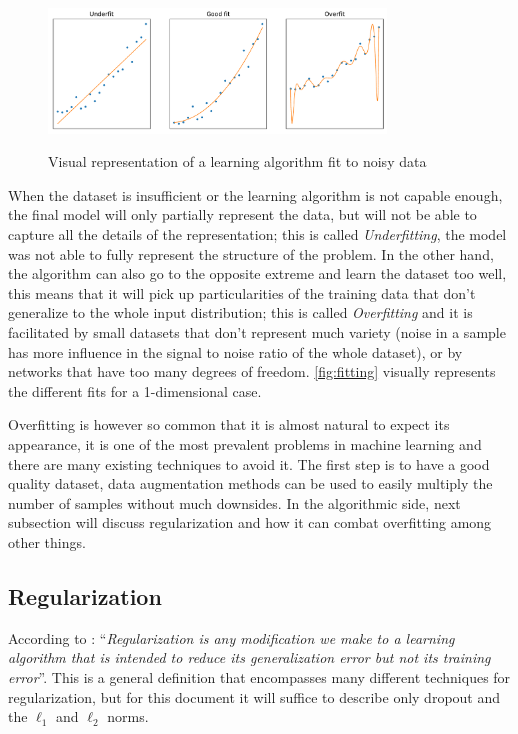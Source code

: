 \begin{figure} [hbt]
    \centering
    \caption{Visual representation of a learning algorithm fit to noisy data}
    \includegraphics[width=0.8\textwidth]{chapters/NeuralNets/figures/fitting.pdf}
    \label{fig:fitting}
\end{figure}
When the dataset is insufficient or the learning algorithm is not capable enough, the final model will only partially represent the data, but will not be able to capture all the details of the representation; this is called \textit{Underfitting}, the model was not able to fully represent the structure of the problem. In the other hand, the algorithm can also go to the opposite extreme and learn the dataset too well, this means that it will pick up particularities of the training data that don't generalize to the whole input distribution; this is called \textit{Overfitting} and it is facilitated by small datasets that don't represent much variety (noise in a sample has more influence in the signal to noise ratio of the whole dataset), or by networks that have too many degrees of freedom. \autoref{fig:fitting} visually represents the different fits for a 1-dimensional case.

Overfitting is however so common that it is almost natural to expect its appearance, it is one of the most prevalent problems in machine learning and there are many existing techniques to avoid it. The first step is to have a good quality dataset, data augmentation methods can be used to easily multiply the number of samples without much downsides. In the algorithmic side, next subsection will discuss regularization and how it can combat overfitting among other things.

\subsection{Regularization} \label{sub:regularization}
According to \cite[p. 117]{deepLearningBook2016}: ``\textit{Regularization is any modiﬁcation we make to a learning algorithm that is intended to reduce its generalization error but not its training error}''. This is a general definition that encompasses many different techniques for regularization, but for this document it will suffice to describe only dropout and the $\ell_1$ and $\ell_2$ norms.


